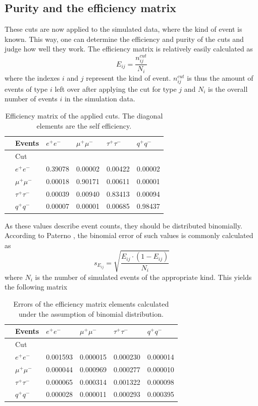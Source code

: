 \subsection{Purity and the efficiency matrix}
These cuts are now applied to the simulated data, where the kind of event is known. This way, one can determine the efficiency and purity of the cuts and judge how well they work. 
The efficiency matrix is relatively easily calculated as
\begin{equation}
E_{ij}=\frac{n^{cut}_{ij}}{N_i}
\end{equation}
where the indexes $i$ and $j$ represent the kind of event. $n_{ij}^{cut}$ is thus the amount of events of type $i$ left over after applying the cut for type $j$ and $N_i$ is the overall number of events $i$ in the simulation data.
\begin{table}[H]\centering
	\begin{tabular}{@{}llllll@{}}
		\toprule
		&Events &$e^+e^-$&$\mu^+\mu^-$&$\tau^+\tau^-$&$q^+q^-$\\
		\midrule
		&Cut&&&&\\
		&$e^+e^-$&0.39078&0.00002&0.00422&0.00002\\
		&$\mu^+\mu^-$&0.00018&0.90171&0.00611&0.00001\\
		&$\tau^+\tau^-$&0.00039&0.00940&0.83413&0.00094\\
		&$q^+q^-$&0.00007&0.00001&0.00685&0.98437\\
	\end{tabular}
	\caption[Efficiency matrix]{Efficiency matrix of the applied cuts. The diagonal elements are the self efficiency.}
	\label{tb:efficiency}
\end{table}

As these values describe event counts, they should be distributed binomially. According to Paterno \cite{binpaper}, the binomial error of such values is commonly calculated as
\begin{equation}
s_{E_{ij}}=\sqrt{\frac{E_{ij}\cdot(1-E_{ij})}{N_i}}
\end{equation}
where $N_i$ is the number of simulated events of the appropriate kind. This yields the following matrix

\begin{table}[H]\centering
	\begin{tabular}{@{}llllll@{}}
		\toprule
		&Events &$e^+e^-$&$\mu^+\mu^-$&$\tau^+\tau^-$&$q^+q^-$\\
		\midrule
		&Cut&&&&\\
		&$e^+e^-$&0.001593&0.000015&0.000230&0.000014\\
		&$\mu^+\mu^-$&0.000044&0.000969&0.000277&0.000010\\
		&$\tau^+\tau^-$&0.000065&0.000314&0.001322&0.000098\\
		&$q^+q^-$&0.000028&0.000011&0.000293&0.000395\\
		\bottomrule
	\end{tabular}
	\caption[Efficiency error matrix]{Errors of the efficiency matrix elements calculated under the assumption of binomial distribution.}
	\label{tb:efficiencyerr}
\end{table}

